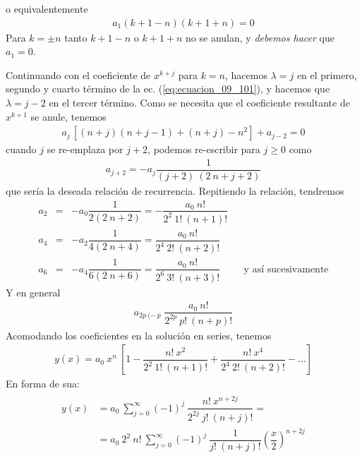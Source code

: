 o equivalentemente
\begin{align}
a_{1} (k + 1 - n)(k + 1 + n) = 0
\label{eq:ecuacion_09_104}
\end{align}
Para $k = \pm n$ tanto $k + 1 -n$ o $k + 1 + n$ no se anulan, y \emph{debemos hacer} que $a_{1} = 0$.
\par
Continuando con el coeficiente de $x^{k+j}$ para $k=n$, hacemos $\lambda=j$ en el primero, segundo y cuarto término de la ec. (\ref{eq:ecuacion_09_101}), y hacemos que $\lambda = j - 2$ en el tercer término. Como se necesita que el coeficiente resultante de $x^{k+1}$ se anule, tenemos
\begin{align*}
a_{j} \, [(n + j)(n + j - 1) + (n + j) - n^{2}] + a_{j-2} = 0
\end{align*}
cuando $j$ se re-emplaza por $j+2$, podemos re-escribir para $j \geq 0$ como
\begin{align}
a_{j+2} = - a_{j} \dfrac{1}{(j + 2) \: (2 \: n + j + 2)}
\label{eq:ecuacion_09_105}
\end{align}
que sería la deseada relación de recurrencia. Repitiendo la relación, tendremos
\begin{align*}
a_{2} &=& - a_{0} \dfrac{1}{2(2 \: n + 2)} = - \dfrac{a_{0} \: n!}{2^{2} \: 1! \: (n + 1)!} \\[0.5em]
a_{4} &=& - a_{2} \dfrac{1}{4(2 \: n + 4)} =  \dfrac{a_{0} \: n!}{2^{4} \: 2! \: (n + 2)!} \\[0.5em]
a_{6} &=& - a_{4} \dfrac{1}{6(2 \: n + 6)} =  \dfrac{a_{0} \: n!}{2^{6} \: 3! \: (n + 3)!} \hspace{1cm}\mbox{y así sucesivamente}
\end{align*}
Y en general
\begin{align}
a_{2 p \: (- \: p} \; \dfrac{a_{0} \: n!}{2^{2p} \: p! \: (n+p)!}
\label{eq:ecuacion_09_106}
\end{align}
Acomodando los coeficientes en la solución en series, tenemos
\begin{align}
y(x) = a_{0} \: x^{n} \: \left[ 1 - \dfrac{n! \: x^{2}}{2^{2} \: 1! \: (n + 1)!} + \dfrac{n! \: x^{4}}{2^{4} \: 2! \: (n+2)!} - \ldots \right]
\label{eq:ecuacion_09_107}
\end{align}
En forma de sua:
\begin{align}
\begin{aligned} 
y(x) &= a_{0}\: \sum_{j=0}^{\infty} (-1)^{j} \: \dfrac{n! \:  x^{n + 2j}}{2^{2j} \: j! \: (n+j)!} = \\
&= a_{0} \: 2^{2} \: n! \: \sum_{j=0}^{\infty} (-1)^{j} \: \dfrac{1}{j! \: (n+j)!} \left( \dfrac{x}{2} \right)^{n + 2j}
\end{aligned}	
\label{eq:ecuacion_09_108}  
\end{align}
